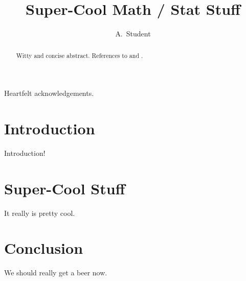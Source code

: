 \documentclass[12pt,openany,twoside,draftmode]{report}
\begin{document}
\def\thechapter       {\arabic{chapter}}
\def\thesection       {\arabic{chapter}.\Alph{section}}
\def\thefigure        {\arabic{chapter}.\arabic{figure}}
\def\theequation      {\arabic{chapter}.\arabic{equation}}

\thispagestyle{empty}


\title{Super-Cool Math / Stat Stuff}

\author{A.\ Student}


\titlepage


\doublespacing

\begin{abstract}
  Witty and concise abstract.  References to \cite{MathStats38} and
  \cite{Physicist38}.
\end{abstract}


\begin{acknowledgement}
  Heartfelt acknowledgements.
\end{acknowledgement}

\beforebodyoftex

\tableofcontents
\listoffigures
\listoftables

\beginbodyoftex



\chapter{Introduction}

Introduction!

\chapter{Super-Cool Stuff}

It really is pretty cool.

\chapter{Conclusion}

We should really get a beer now.

\singlespacing
{

}

\vfill
\textheight 9in
\eject
\topmargin -1in
\clearpage
{}
{}
\printindex
\end{document}
